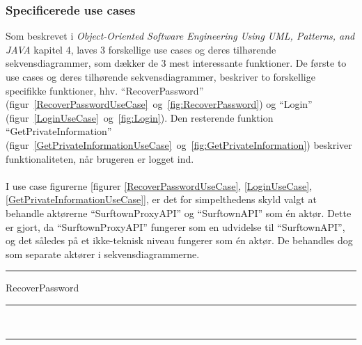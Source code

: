 \documentclass[12pt]{article}
\begin{document}
\subsubsection*{Specificerede use cases}
Som beskrevet i \emph{Object-Oriented Software Engineering Using UML, Patterns, and JAVA}\cite{OOSE} kapitel 4, laves 3 forskellige use cases og deres tilhørende sekvensdiagrammer, som dækker de 3 mest interessante funktioner. De første to use cases og deres tilhørende sekvensdiagrammer, beskriver to forskellige specifikke funktioner, hhv. ``RecoverPassword'' (figur~\ref{RecoverPasswordUseCase}~og~\ref{fig:RecoverPassword}) og ``Login'' (figur~\ref{LoginUseCase}~og~\ref{fig:Login}). Den resterende funktion ``GetPrivateInformation'' (figur~\ref{GetPrivateInformationUseCase}~og~\ref{fig:GetPrivateInformation}) beskriver funktionaliteten, når brugeren er logget ind.\\\\
I use case figurerne [figurer \ref{RecoverPasswordUseCase}, \ref{LoginUseCase}, \ref{GetPrivateInformationUseCase}], er det for simpelthedens skyld valgt at behandle aktørerne ``SurftownProxyAPI'' og ``SurftownAPI'' som én aktør. Dette er gjort, da ``SurftownProxyAPI'' fungerer som en udvidelse til ``SurftownAPI'', og det således på et ikke-teknisk niveau fungerer som én aktør. De behandles dog som separate aktører i sekvensdiagrammerne.
	\hspace{-20pt}
	\rule{430pt}{1.0pt}
	 RecoverPassword\\
	\rule{430pt}{0.4pt}
	\\
	\rule{430pt}{0.4pt}
	\\
\end{document}
